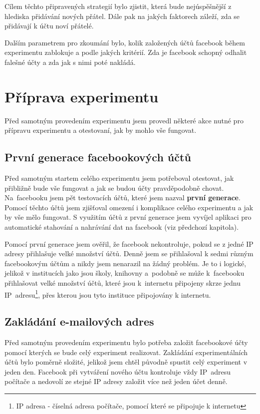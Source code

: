 \documentclass[thesis=M,czech]{FITthesis}[2013/05/10]
\begin{document}
Cílem těchto připravených strategií bylo zjistit, která bude nejúspěšnější z hlediska přidávání nových přátel. Dále pak na jakých faktorech záleží, zda se přidávají k účtu noví přátelé.

Dalším parametrem pro zkoumání bylo, kolik založených účtů facebook během experimentu zablokuje a podle jakých kritérií. Zda je facebook schopný odhalit falešné účty a zda jak s nimi poté nakládá.

\section{Příprava experimentu}

Před samotným provedením experimentu jsem provedl některé akce nutné pro přípravu experimentu a otestovaní, jak by mohlo vše fungovat.

\subsection{První generace facebookových účtů}

Před samotným startem celého experimentu jsem potřeboval otestovat, jak přibližně bude vše fungovat a jak se budou účty pravděpodobně chovat. Na~facebooku jsem pět testovacích účtů, které jsem nazval \textbf{první generace}. Pomocí těchto účtů jsem zjišťoval omezení i komplikace celého experimentu a jak by vše mělo fungovat. S využitím účtů z první generace jsem vyvíjel aplikaci pro automatické stahování a nahrávání dat na facebook (viz předchozí kapitola).

Pomocí první generace jsem ověřil, že facebook nekontroluje, pokud se z jedné IP adresy přihlašuje velké množství účtů. Denně jsem se přihlašoval k sedmi různým facebookovým účtům a nikdy jsem nenarazil na žádný problém. Je to i logické, jelikož v institucích jako jsou školy, knihovny a~podobně se může k~facebooku přihlašovat velké množství účtů, které jsou k~internetu připojeny skrze jednu IP~adresu\footnote{IP adresa - číselná adresa počítače, pomocí které se připojuje k internetu}, přes kterou jsou tyto instituce připojovány k internetu.


\subsection{Zakládání e-mailových adres}

Před samotným provedením experimentu bylo potřeba založit facebookové účty pomocí kterých se bude celý experiment realizovat. Zakládání experimentálních účtů bylo poměrně složité, jelikož jsem chtěl původně spustit celý experiment v jeden den. Facebook při vytváření nového účtu kontroluje vždy IP~adresu počítače a nedovolí ze stejné IP adresy založit více než jeden účet denně. 
\end{document}
